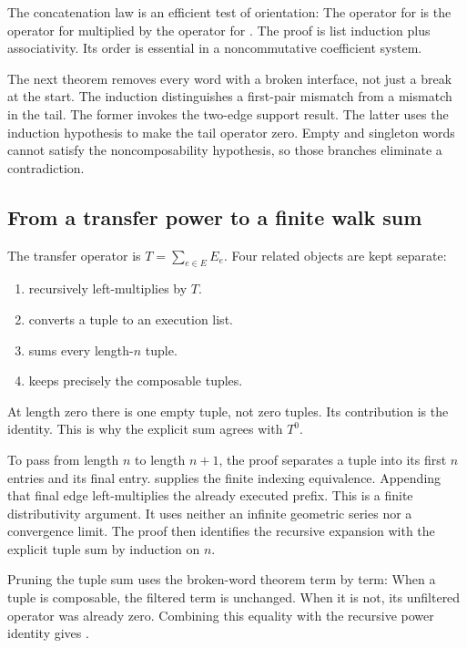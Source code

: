 The concatenation law is an efficient test of orientation:
The operator for  is the operator for  multiplied by the operator for . The proof is list induction plus associativity. Its order is essential in a noncommutative coefficient system.

The next theorem removes every word with a broken interface, not just a break at the start.
The induction distinguishes a first-pair mismatch from a mismatch in the tail. The former invokes the two-edge support result. The latter uses the induction hypothesis to make the tail operator zero. Empty and singleton words cannot satisfy the noncomposability hypothesis, so those branches eliminate a contradiction.

\subsection{From a transfer power to a finite walk sum}
The transfer operator is $T=\sum_{e\in E}E_e$. Four related objects are kept separate:
\begin{enumerate}
\item {} recursively left-multiplies by $T$.
\item {} converts a tuple  to an execution list.
\item {} sums every length-$n$ tuple.
\item {} keeps precisely the composable tuples.
\end{enumerate}
At length zero there is one empty tuple, not zero tuples. Its contribution is the identity. This is why the explicit sum agrees with $T^0$.

To pass from length $n$ to length $n+1$, the proof separates a tuple into its first $n$ entries and its final entry.  supplies the finite indexing equivalence. Appending that final edge left-multiplies the already executed prefix.
This is a finite distributivity argument. It uses neither an infinite geometric series nor a convergence limit. The proof then identifies the recursive expansion with the explicit tuple sum by induction on $n$.

Pruning the tuple sum uses the broken-word theorem term by term:
When a tuple is composable, the filtered term is unchanged. When it is not, its unfiltered operator was already zero. Combining this equality with the recursive power identity gives .

